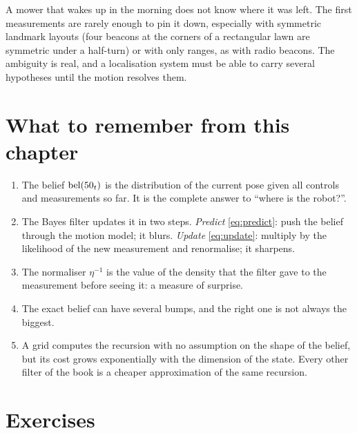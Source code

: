 \begin{mower}
A mower that wakes up in the morning does not know where it was left. The
first measurements are rarely enough to pin it down, especially with
symmetric landmark layouts (four beacons at the corners of a rectangular
lawn are symmetric under a half-turn) or with only ranges, as with radio
beacons. The ambiguity is real, and a localisation system must be able to
carry several hypotheses until the motion resolves them.
\end{mower}

\section*{What to remember from this chapter}

\begin{enumerate}[nosep]
  \item The belief $\operatorname{bel}(50_t)$ is the distribution of the current pose
    given all controls and measurements so far. It is the complete answer
    to ``where is the robot?''.
  \item The Bayes filter updates it in two steps. \emph{Predict}
    \eqref{eq:predict}: push the belief through the motion model; it
    blurs. \emph{Update} \eqref{eq:update}: multiply by the likelihood of
    the new measurement and renormalise; it sharpens.
  \item The normaliser $\eta^{-1}$ is the value of the density that the
    filter gave to the measurement before seeing it: a measure of
    surprise.
  \item The exact belief can have several bumps, and the right one is not
    always the biggest.
  \item A grid computes the recursion with no assumption on the shape of
    the belief, but its cost grows exponentially with the dimension of the
    state. Every other filter of the book is a cheaper approximation of
    the same recursion.
\end{enumerate}

\FloatBarrier
\section*{Exercises}

